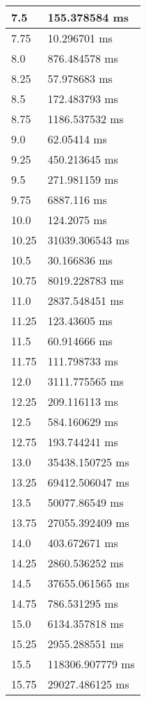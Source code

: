 \begin{multicols}{2}
\begin{tabular}{|l|l|}
		7.5 & 155.378584 ms \\ \hline
		7.75 & 10.296701 ms \\ \hline
		8.0 & 876.484578 ms \\ \hline
		8.25 & 57.978683 ms \\ \hline
		8.5 & 172.483793 ms \\ \hline
		8.75 & 1186.537532 ms \\ \hline
		9.0 & 62.05414 ms \\ \hline
		9.25 & 450.213645 ms \\ \hline
		9.5 & 271.981159 ms \\ \hline
		9.75 & 6887.116 ms \\ \hline
		10.0 & 124.2075 ms \\ \hline
		10.25 & 31039.306543 ms \\ \hline
		10.5 & 30.166836 ms \\ \hline
		10.75 & 8019.228783 ms \\ \hline
		11.0 & 2837.548451 ms \\ \hline
		11.25 & 123.43605 ms \\ \hline
		11.5 & 60.914666 ms \\ \hline
		11.75 & 111.798733 ms \\ \hline
		12.0 & 3111.775565 ms \\ \hline
		12.25 & 209.116113 ms \\ \hline
		12.5 & 584.160629 ms \\ \hline
		12.75 & 193.744241 ms \\ \hline
		13.0 & 35438.150725 ms \\ \hline
		13.25 & 69412.506047 ms \\ \hline
		13.5 & 50077.86549 ms \\ \hline
		13.75 & 27055.392409 ms \\ \hline
		14.0 & 403.672671 ms \\ \hline
		14.25 & 2860.536252 ms \\ \hline
		14.5 & 37655.061565 ms \\ \hline
		14.75 & 786.531295 ms \\ \hline
		15.0 & 6134.357818 ms \\ \hline
		15.25 & 2955.288551 ms \\ \hline
		15.5 & 118306.907779 ms \\ \hline
		15.75 & 29027.486125 ms \\ \hline
	\end{tabular}\\
	\begin{tabular}{|l|l|}

\end{tabular}
\end{multicols}
